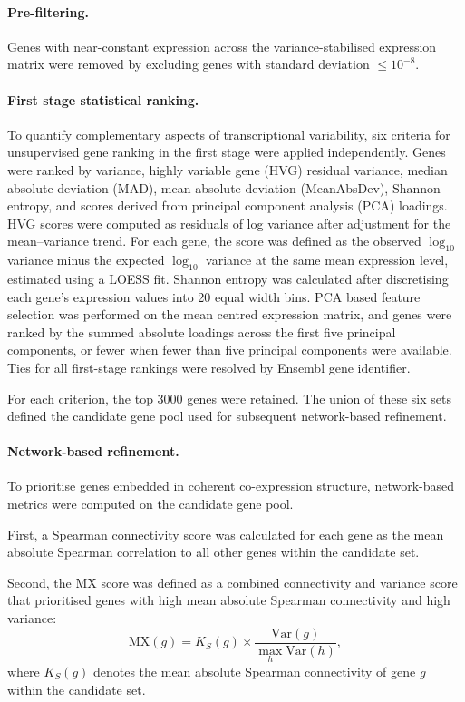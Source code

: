 \paragraph{Pre-filtering.}
Genes with near-constant expression across the variance-stabilised expression matrix were removed by excluding genes with standard deviation $\leq 10^{-8}$. 

\paragraph{First stage statistical ranking.}
To quantify complementary aspects of transcriptional variability, six criteria
for unsupervised gene ranking in the first stage were applied independently.
Genes were ranked by variance, highly variable gene (HVG) residual variance,
median absolute deviation (MAD), mean absolute deviation (MeanAbsDev), Shannon
entropy, and scores derived from principal component analysis (PCA) loadings.
HVG scores were computed as residuals of log variance after adjustment for the
mean--variance trend. For each
gene, the score was defined as the observed \(\log_{10}\) variance minus the
expected \(\log_{10}\) variance at the same mean expression level, estimated
using a LOESS fit. Shannon entropy was calculated after discretising each
gene's expression values into 20 equal width bins. PCA based feature selection
was performed on the mean centred expression matrix, and genes were ranked by
the summed absolute loadings across the first five principal components, or
fewer when fewer than five principal components were available. Ties for all
first-stage rankings were resolved by Ensembl gene identifier.

For each criterion, the top 3000 genes were retained. The union of these six
sets defined the candidate gene pool used for subsequent network-based
refinement.

\paragraph{Network-based refinement.}

To prioritise genes embedded in coherent co-expression structure, network-based metrics were computed on the candidate gene pool.

First, a Spearman connectivity score was calculated for each gene as the mean absolute Spearman correlation to all other genes within the candidate set.

Second, the MX score was defined as a combined connectivity and variance score that prioritised genes with high mean absolute Spearman connectivity and high variance:
\[
\mathrm{MX}(g)=K_S(g)\times \frac{\mathrm{Var}(g)}{\max_h \mathrm{Var}(h)},
\]
where \(K_S(g)\) denotes the mean absolute Spearman connectivity of gene \(g\) within the candidate set.

